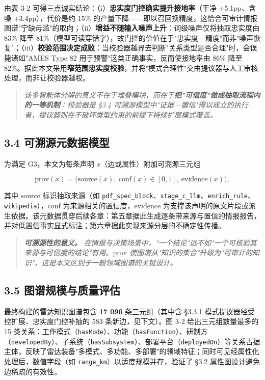 \documentclass[12pt,a4paper]{ctexart}
\begin{document}
由表 3-2 可得三点诚实结论：（i）\textbf{忠实度门控确实提升接地率}（干净 +5.1pp、含噪 +3.4pp），代价是约 15\% 的产量下降——即以召回换精度，这恰合可审计情报图谱"宁缺毋滥"的取向；（ii）\textbf{增益不随输入噪声上升}：词级噪声仅将抽取忠实度由 83\% 降至 81\%（模型可读穿错字），故门控的价值在于"忠实度—精度"而非"噪声恢复"；（iii）\textbf{校验范围决定成败}：当校验器越界去判断"关系类型是否合理"时，会误毙诸如"AMES Type 82 用于预警"这类正确事实，反而使接地率由 86\% 降至 82\%。据此本文采用\textbf{窄范围忠实度校验}，并将"模式合理性"交由提议器与人工审核处理，而非让校验器越权。

\begin{quote}\itshape 该多智能体分解的意义不在于堆叠模块，而在于\textbf{把"可信度"做成抽取流程内的一等机制}：校验器是 §3.4 可溯源模型中"证据—置信"得以成立的执行者，提议器则在不破坏类型约束的前提下持续扩展模式覆盖。\end{quote}

\subsection*{3.4 可溯源元数据模型}

为满足 G3，本文为每条声明 $x$（边或属性）附加可溯源三元组

\[\mathrm{prov}(x)=\big(\mathrm{source}(x),\ \mathrm{conf}(x)\in[0,1],\ \mathrm{evidence}(x)\big),\]

其中 $\mathrm{source}$ 标识抽取来源（如 \texttt{pdf\_spec\_block}、\texttt{stage\_c\_llm}、\texttt{enrich\_rule}、\texttt{wikipedia}），$\mathrm{conf}$ 为来源相关的置信度，$\mathrm{evidence}$ 为支撑该声明的原文片段或派生依据。该元数据贯穿后续各章：第五章据此生成逐条带来源与置信的情报报告，并对低置信事实显式标注；第六章据此实现来源分层的不确定性传播。

\begin{quote}\itshape \textbf{可溯源性的意义。} 在情报与决策场景中，"一个结论"远不如"一个可核验其来源与可信度的结论"有用。$\mathrm{prov}$ 使图谱从"知识的集合"升级为"可审计的知识"，这是本文区别于一般领域图谱的关键设计。\end{quote}

\subsection*{3.5 图谱规模与质量评估}

最终构建的雷达知识图谱包含 \textbf{17 096} 条三元组（其中含 §3.3.1 模式提议器经受控扩展、忠实度门控补抽的 583 条新边，见下文）。图 3-2 给出三元组数量最多的 15 类关系：工作模式（\texttt{hasMode}）、功能（\texttt{hasFunction}）、研制方（\texttt{developedBy}）、子系统（\texttt{hasSubsystem}）、部署平台（\texttt{deployedOn}）等关系占据主体，反映了雷达装备"多模式、多功能、多部署"的领域特征；同时可见经属性化处理后，数值字段（如 \texttt{range\_km}）以适度规模并存，验证了 §3.2 属性图设计避免边稀疏的有效性。
\end{document}
